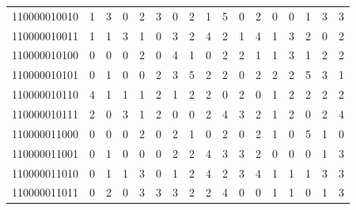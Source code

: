 \documentclass[10pt,a4paper]{article}
\begin{document}
\begin{longtable}{ |c|c|c|c|c|c|c|c|c|c|c|c|c|c|c|c|c| }
    110000010010              & 1                            & 3                                & 0                            & 2                              & 3   & 0   & 2   & 1   & 5   & 0   & 2   & 0   & 0   & 1   & 3   & 3   \\
    110000010011              & 1                            & 1                                & 3                            & 1                              & 0   & 3   & 2   & 4   & 2   & 1   & 4   & 1   & 3   & 2   & 0   & 2   \\
    110000010100              & 0                            & 0                                & 0                            & 2                              & 0   & 4   & 1   & 0   & 2   & 2   & 1   & 1   & 3   & 1   & 2   & 2   \\
    110000010101              & 0                            & 1                                & 0                            & 0                              & 2   & 3   & 5   & 2   & 2   & 0   & 2   & 2   & 2   & 5   & 3   & 1   \\
    110000010110              & 4                            & 1                                & 1                            & 1                              & 2   & 1   & 2   & 2   & 0   & 2   & 0   & 1   & 2   & 2   & 2   & 2   \\
    110000010111              & 2                            & 0                                & 3                            & 1                              & 2   & 0   & 0   & 2   & 4   & 3   & 2   & 1   & 2   & 0   & 2   & 4   \\
    110000011000              & 0                            & 0                                & 0                            & 2                              & 0   & 2   & 1   & 0   & 2   & 0   & 2   & 1   & 0   & 5   & 1   & 0   \\
    110000011001              & 0                            & 1                                & 0                            & 0                              & 0   & 2   & 2   & 4   & 3   & 3   & 2   & 0   & 0   & 0   & 1   & 3   \\
    110000011010              & 0                            & 1                                & 1                            & 3                              & 0   & 1   & 2   & 4   & 2   & 3   & 4   & 1   & 1   & 1   & 3   & 3   \\
    110000011011              & 0                            & 2                                & 0                            & 3                              & 3   & 3   & 2   & 2   & 4   & 0   & 0   & 1   & 1   & 0   & 1   & 3   \\

\end{longtable}
\end{document}
